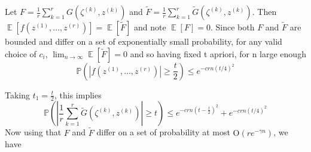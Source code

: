 \documentclass[11pt]{article}
\newcommand{\<}{\langle}
\renewcommand{\>}{\rangle}
\newcommand{\E}{\operatorname{\mathbb{E}}}
\numberwithin{equation}{section}
\newcommand{\Prob}{\mathbb{P}}
\begin{document}
Let $F = \frac{1}{r}\sum_{k=1}^r G(\zeta^{(k)},z^{(k)})$ and  $\tilde{F} = \frac{1}{r}\sum_{k=1}^r \tilde{G}(\zeta^{(k)},z^{(k)})$. Then $ \E\left[ f(z^{(1)},\ldots,z^{(r)}) \right] = \E\left[ \tilde{F} \right]$ and note $\E\left[F \right] = 0$. Since both $F$ and $\tilde{F}$ are bounded and differ on a set of exponentially small probability, for any valid choice of $c_i$, $\lim_{n \rightarrow \infty} \E\left[\tilde{F}\right] = 0$ and so having fixed t apriori, for n large enough
\[
\Prob\left( \left| f(z^{(1)},\ldots,z^{(r)})\right| \geq \frac{t}{2} \right) \leq e^{-crn(t/4)^2} 
\]

%
Taking $t_1 = \frac{t}{2}$, this implies 
\[
\Prob \left( |\frac{1}{r}\sum_{k=1}^r \tilde{G}(\zeta^{(k)},z^{(k)})|\geq t \right)  \leq e^{-crn(t-\frac{t}{2})^2} + e^{-crn(t/4)^2 }
\]
Now using that $F$ and $\tilde{F}$ differ on a set of  probability at most $\text{O}(re^{-\gamma n})$, we have
\end{document}

